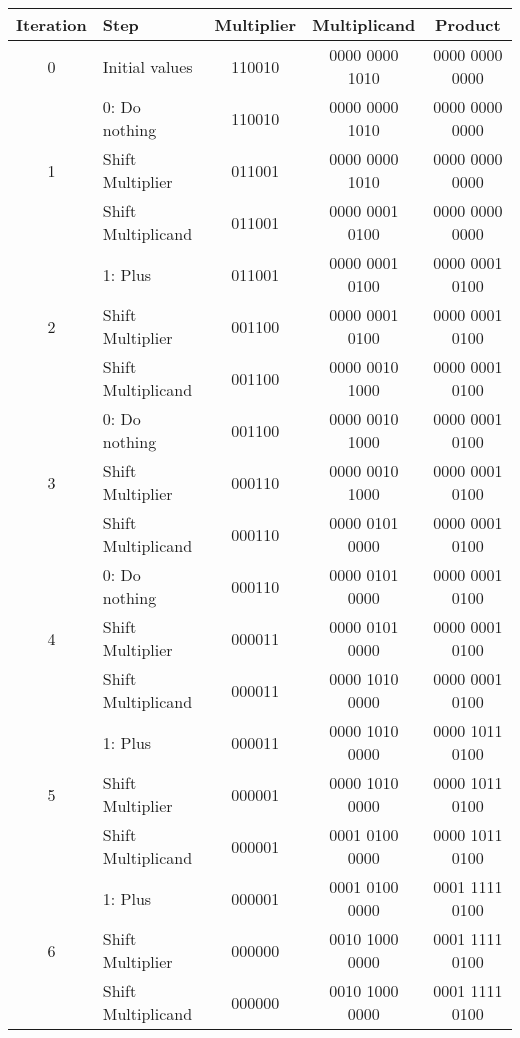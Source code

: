 \documentclass[paper=a4, fontsize=11pt]{scrartcl} %
\begin{document}
\begin{tabular}{clccc}
  Iteration           & Step            & Multiplier & Multiplicand & Product \\
  \toprule
  0                   & Initial values     & 110010  & 0000 0000 1010  & 0000 0000 0000 \\
  \midrule
  \multirow{3}{*}{1}  & 0: Do nothing      & 110010  & 0000 0000 1010  & 0000 0000 0000 \\
                      & Shift Multiplier   & 011001  & 0000 0000 1010  & 0000 0000 0000 \\
                      & Shift Multiplicand & 011001  & 0000 0001 0100  & 0000 0000 0000 \\
  \midrule
  \multirow{3}{*}{2}  & 1: Plus            & 011001  & 0000 0001 0100  & 0000 0001 0100 \\
                      & Shift Multiplier   & 001100  & 0000 0001 0100  & 0000 0001 0100 \\
                      & Shift Multiplicand & 001100  & 0000 0010 1000  & 0000 0001 0100 \\
  \midrule
  \multirow{3}{*}{3}  & 0: Do nothing      & 001100  & 0000 0010 1000  & 0000 0001 0100 \\
                      & Shift Multiplier   & 000110  & 0000 0010 1000  & 0000 0001 0100 \\
                      & Shift Multiplicand & 000110  & 0000 0101 0000  & 0000 0001 0100 \\
  \midrule
  \multirow{3}{*}{4}  & 0: Do nothing      & 000110  & 0000 0101 0000  & 0000 0001 0100 \\
                      & Shift Multiplier   & 000011  & 0000 0101 0000  & 0000 0001 0100 \\
                      & Shift Multiplicand & 000011  & 0000 1010 0000  & 0000 0001 0100 \\
  \midrule
  \multirow{3}{*}{5}  & 1: Plus            & 000011  & 0000 1010 0000  & 0000 1011 0100 \\
                      & Shift Multiplier   & 000001  & 0000 1010 0000  & 0000 1011 0100 \\
                      & Shift Multiplicand & 000001  & 0001 0100 0000  & 0000 1011 0100 \\
  \midrule
  \multirow{3}{*}{6}  & 1: Plus            & 000001  & 0001 0100 0000  & 0001 1111 0100 \\
                      & Shift Multiplier   & 000000  & 0010 1000 0000  & 0001 1111 0100 \\
                      & Shift Multiplicand & 000000  & 0010 1000 0000  & 0001 1111 0100 \\
  \bottomrule
\end{tabular}
\end{document}
